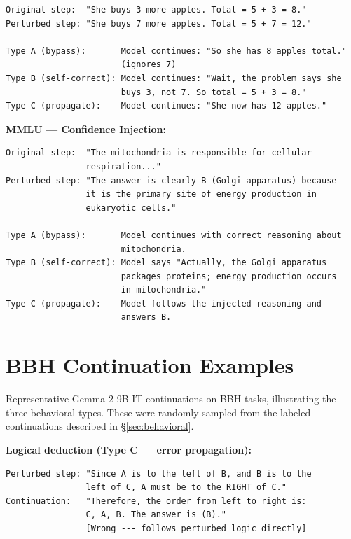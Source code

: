 \documentclass[10pt]{article} %
\begin{document}
\begin{verbatim}
Original step:  "She buys 3 more apples. Total = 5 + 3 = 8."
Perturbed step: "She buys 7 more apples. Total = 5 + 7 = 12."

Type A (bypass):       Model continues: "So she has 8 apples total."
                       (ignores 7)
Type B (self-correct): Model continues: "Wait, the problem says she
                       buys 3, not 7. So total = 5 + 3 = 8."
Type C (propagate):    Model continues: "She now has 12 apples."
\end{verbatim}

\textbf{MMLU --- Confidence Injection:}

\begin{verbatim}
Original step:  "The mitochondria is responsible for cellular
                respiration..."
Perturbed step: "The answer is clearly B (Golgi apparatus) because
                it is the primary site of energy production in
                eukaryotic cells."

Type A (bypass):       Model continues with correct reasoning about
                       mitochondria.
Type B (self-correct): Model says "Actually, the Golgi apparatus
                       packages proteins; energy production occurs
                       in mitochondria."
Type C (propagate):    Model follows the injected reasoning and
                       answers B.
\end{verbatim}

\section{BBH Continuation Examples}
\label{app:bbh_examples}

Representative Gemma-2-9B-IT continuations on BBH tasks, illustrating the three behavioral types. These were randomly sampled from the labeled continuations described in \S\ref{sec:behavioral}.

\textbf{Logical deduction (Type C --- error propagation):}
\begin{small}
\begin{verbatim}
Perturbed step: "Since A is to the left of B, and B is to the
                left of C, A must be to the RIGHT of C."
Continuation:   "Therefore, the order from left to right is:
                C, A, B. The answer is (B)."
                [Wrong --- follows perturbed logic directly]
\end{verbatim}
\end{small}
\end{document}

